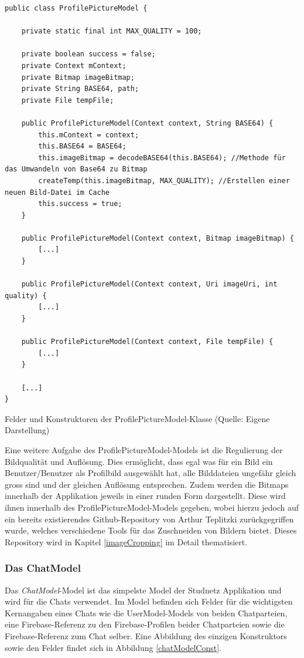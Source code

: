 \documentclass[../main.tex]{subfiles}
\begin{document}
\begin{code}
	\begin{center}
		\begin{verbatim}
public class ProfilePictureModel {

	private static final int MAX_QUALITY = 100;

	private boolean success = false;
	private Context mContext;
	private Bitmap imageBitmap;
	private String BASE64, path;
	private File tempFile;

	public ProfilePictureModel(Context context, String BASE64) {
		this.mContext = context;
		this.BASE64 = BASE64;
		this.imageBitmap = decodeBASE64(this.BASE64); //Methode für das Umwandeln von Base64 zu Bitmap
		createTemp(this.imageBitmap, MAX_QUALITY); //Erstellen einer neuen Bild-Datei im Cache
		this.success = true;
	}

	public ProfilePictureModel(Context context, Bitmap imageBitmap) {
		[...]
	}

	public ProfilePictureModel(Context context, Uri imageUri, int quality) {
		[...]
	}

	public ProfilePictureModel(Context context, File tempFile) {
		[...]
	}
	
	[...]
}
		\end{verbatim}
		\caption{Felder und Konstruktoren der ProfilePictureModel-Klasse (Quelle: Eigene Darstellung)}
		\label{profilePictureModelConst}
	\end{center}
	
\end{code}

	Eine weitere Aufgabe des ProfilePictureModel-Models ist die Regulierung der Bildqualität und Auflösung. Dies ermöglicht, dass egal was für ein Bild ein Benutzer/Benutzer als Profilbild ausgewählt hat, alle Bilddateien ungefähr gleich gross sind und der gleichen Auflösung entsprechen. Zudem werden die Bitmaps innerhalb der Applikation jeweils in einer runden Form dargestellt. Diese wird ihnen innerhalb des ProfilePictureModel-Models gegeben, wobei hierzu jedoch auf ein bereits existierendes Github-Repository von Arthur Teplitzki \cite{Cropper} zurückgegriffen wurde, welches verschiedene Tools für das Zuschneiden von Bildern bietet. Dieses Repository wird in Kapitel \ref{imageCropping} im Detail thematisiert.
	
	\subsubsection{Das ChatModel}
	Das \emph{ChatModel}-Model ist das simpelste Model der Studnetz Applikation und wird für die Chats verwendet. Im Model befinden sich Felder für die wichtigsten Kernangaben eines Chats wie die UserModel-Models von beiden Chatparteien, eine Firebase-Referenz zu den Firebase-Profilen beider Chatparteien sowie die Firebase-Referenz zum Chat selber. Eine Abbildung des einzigen Konstruktors sowie den Felder findet sich in Abbildung \ref{chatModelConst}.
	
\end{document}

